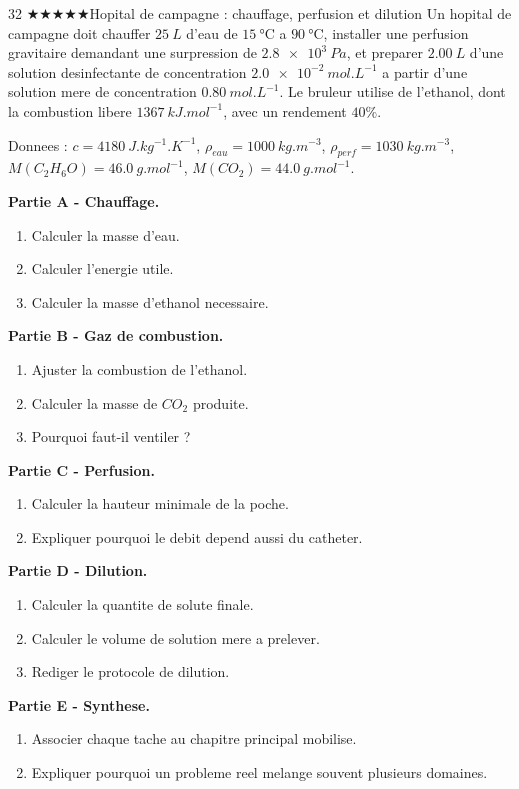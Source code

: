 \documentclass[11pt,a4paper]{article}
\newcommand{\difffive}{\(\bigstar\bigstar\bigstar\bigstar\bigstar\)}
\begin{document}
\begin{probleme}{32 \difffive}{Hopital de campagne : chauffage, perfusion et dilution}
Un hopital de campagne doit chauffer \(\SI{25}{L}\) d'eau de \(\SI{15}{\celsius}\) a \(\SI{90}{\celsius}\), installer une perfusion gravitaire demandant une surpression de \(\SI{2.8e3}{Pa}\), et preparer \(\SI{2.00}{L}\) d'une solution desinfectante de concentration \(\SI{2.0e-2}{mol.L^{-1}}\) a partir d'une solution mere de concentration \(\SI{0.80}{mol.L^{-1}}\). Le bruleur utilise de l'ethanol, dont la combustion libere \(\SI{1367}{kJ.mol^{-1}}\), avec un rendement \(40\%\).

Donnees : \(c=\SI{4180}{J.kg^{-1}.K^{-1}}\), \(\rho_{eau}=\SI{1000}{kg.m^{-3}}\), \(\rho_{perf}=\SI{1030}{kg.m^{-3}}\), \(M(C_2H_6O)=\SI{46.0}{g.mol^{-1}}\), \(M(CO_2)=\SI{44.0}{g.mol^{-1}}\).

\textbf{Partie A - Chauffage.}
\begin{enumerate}
\item Calculer la masse d'eau.
\item Calculer l'energie utile.
\item Calculer la masse d'ethanol necessaire.
\end{enumerate}

\textbf{Partie B - Gaz de combustion.}
\begin{enumerate}[resume]
\item Ajuster la combustion de l'ethanol.
\item Calculer la masse de \(CO_2\) produite.
\item Pourquoi faut-il ventiler ?
\end{enumerate}

\textbf{Partie C - Perfusion.}
\begin{enumerate}[resume]
\item Calculer la hauteur minimale de la poche.
\item Expliquer pourquoi le debit depend aussi du catheter.
\end{enumerate}

\textbf{Partie D - Dilution.}
\begin{enumerate}[resume]
\item Calculer la quantite de solute finale.
\item Calculer le volume de solution mere a prelever.
\item Rediger le protocole de dilution.
\end{enumerate}

\textbf{Partie E - Synthese.}
\begin{enumerate}[resume]
\item Associer chaque tache au chapitre principal mobilise.
\item Expliquer pourquoi un probleme reel melange souvent plusieurs domaines.
\end{enumerate}
\end{probleme}
\end{document}

